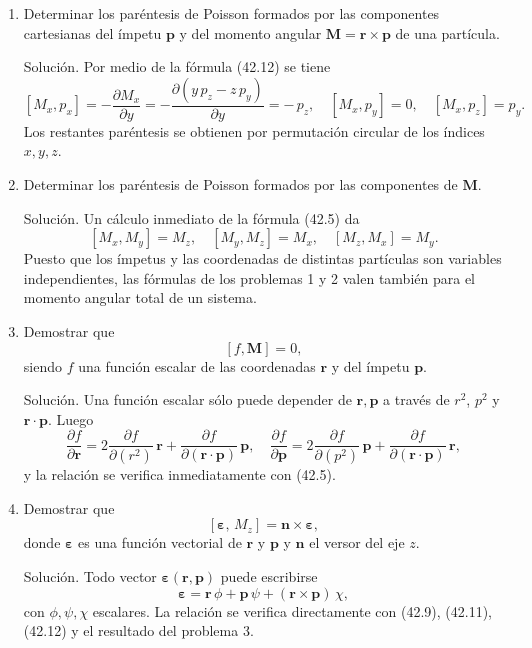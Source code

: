 \documentclass[12pt]{article}
\begin{document}
\begin{enumerate}
\item Determinar los paréntesis de Poisson formados por las componentes cartesianas del ímpetu $\mathbf p$ y del momento angular $\mathbf M=\mathbf r\times\mathbf p$ de una partícula.

Solución. Por medio de la fórmula (42.12) se tiene
\[
[M_x,p_x]
= -\frac{\partial M_x}{\partial y}
= -\frac{\partial(y\,p_z - z\,p_y)}{\partial y}
= -\,p_z,
\quad
[M_x,p_y]=0,
\quad
[M_x,p_z]=p_y.
\]
Los restantes paréntesis se obtienen por permutación circular de los índices $x,y,z$.

\item Determinar los paréntesis de Poisson formados por las componentes de $\mathbf M$.

Solución. Un cálculo inmediato de la fórmula (42.5) da
\[
[M_x,M_y]=M_z,\quad
[M_y,M_z]=M_x,\quad
[M_z,M_x]=M_y.
\]
Puesto que los ímpetus y las coordenadas de distintas partículas son variables independientes, las fórmulas de los problemas 1 y 2 valen también para el momento angular total de un sistema.

\item Demostrar que
\[
[f,\mathbf M]=0,
\]
siendo $f$ una función escalar de las coordenadas $\mathbf r$ y del ímpetu $\mathbf p$.

Solución. Una función escalar sólo puede depender de $\mathbf r,\mathbf p$ a través de $r^2$, $p^2$ y $\mathbf r\cdot\mathbf p$. Luego
\[
\frac{\partial f}{\partial\mathbf r}
=2\frac{\partial f}{\partial(r^2)}\,\mathbf r
+\frac{\partial f}{\partial(\mathbf r\cdot\mathbf p)}\,\mathbf p,
\quad
\frac{\partial f}{\partial\mathbf p}
=2\frac{\partial f}{\partial(p^2)}\,\mathbf p
+\frac{\partial f}{\partial(\mathbf r\cdot\mathbf p)}\,\mathbf r,
\]
y la relación se verifica inmediatamente con (42.5).

\item Demostrar que
\[
[\boldsymbol\varepsilon,\,M_z]
=\mathbf n\times\boldsymbol\varepsilon,
\]
donde $\boldsymbol\varepsilon$ es una función vectorial de $\mathbf r$ y $\mathbf p$ y $\mathbf n$ el versor del eje $z$.

Solución. Todo vector $\boldsymbol\varepsilon(\mathbf r,\mathbf p)$ puede escribirse
\[
\boldsymbol\varepsilon
=\mathbf r\,\phi+\mathbf p\,\psi+(\mathbf r\times\mathbf p)\,\chi,
\]
con $\phi,\psi,\chi$ escalares. La relación se verifica directamente con (42.9), (42.11), (42.12) y el resultado del problema 3.
\end{enumerate}
\end{document}
